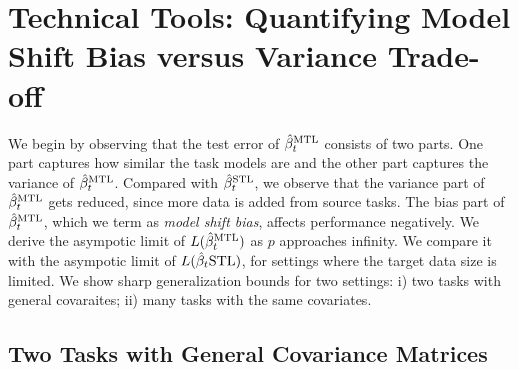 \section{Technical Tools: Quantifying Model Shift Bias versus Variance Trade-off}\label{sec_main}

We begin by observing that the test error of $\hat{\beta}_t^{\text{MTL}}$ consists of two parts.
One part captures how similar the task models are and the other part captures the variance of $\hat{\beta}_t^{\text{MTL}}$.
Compared with $\hat{\beta}_t^{\text{STL}}$, we observe that the variance part of $\hat{\beta}_t^{\text{MTL}}$ gets reduced, since more data is added from source tasks.
The bias part of $\hat{\beta}_t^{\text{MTL}}$, which we term as \textit{model shift bias}, affects performance negatively.
We derive the asympotic limit of $L(\hat{\beta}_t^{\text{MTL}})$ as $p$ approaches infinity.
We compare it with the asympotic limit of $L(\hat{\beta}_t{\text{STL}})$, for settings where the target data size is limited.
We show sharp generalization bounds for two settings: i) two tasks with general covaraites; ii) many tasks with the same covariates.

\subsection{Two Tasks with General Covariance Matrices}

